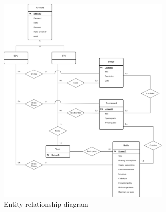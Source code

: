 \begin{figure}[H]
    \centering
    \includegraphics[width=0.75\textwidth]{images/diagrams/er_diagram.png}
    \caption{Entity-relationship diagram}
    \label{fig:er_diagram}
\end{figure}

